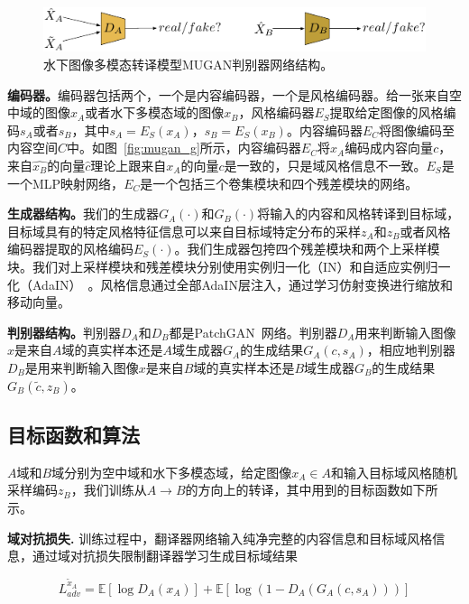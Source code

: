 \begin{figure}[ht]
    \centering
    \includegraphics[width=1\textwidth]{figures/D.pdf}
    \caption{水下图像多模态转译模型MUGAN判别器网络结构。}
    \label{fig:mugan_d}
\end{figure}

\textbf{编码器。}编码器包括两个，一个是内容编码器，一个是风格编码器。给一张来自空中域的图像$x_A$或者水下多模态域的图像$x_B$，风格编码器$E_S$提取给定图像的风格编码$s_A$或者$s_B$，其中$s_A = E_S(x_A)$，$s_B = E_S(x_B)$。内容编码器$E_C$将图像编码至内容空间$C$中。如图~\ref{fig:mugan_g}所示，内容编码器$E_C$将$x_A$编码成内容向量$c$，来自$\hat{x_B}$的向量$\hat{c}$理论上跟来自$x_A$的向量$c$是一致的，只是域风格信息不一致。$E_S$是一个MLP映射网络，$E_C$是一个包括三个卷集模块和四个残差模块的网络。

\textbf{生成器结构。}我们的生成器$G_A(\cdot)$和$G_B(\cdot)$将输入的内容和风格转译到目标域，目标域具有的特定风格特征信息可以来自目标域特定分布的采样$z_A$和$z_B$或者风格编码器提取的风格编码$E_S(\cdot)$。我们生成器包挎四个残差模块和两个上采样模块。我们对上采样模块和残差模块分别使用实例归一化（IN）和自适应实例归一化（AdaIN）~\cite{huang2017arbitrary}。风格信息通过全部AdaIN层注入，通过学习仿射变换进行缩放和移动向量。

\textbf{判别器结构。}判别器$D_A$和$D_B$都是PatchGAN~\cite{isola2017image}网络。判别器$D_A$用来判断输入图像$x$是来自$A$域的真实样本还是$A$域生成器$G_A$的生成结果$G_A(c,s_A)$，相应地判别器$D_B$是用来判断输入图像$x$是来自$B$域的真实样本还是$B$域生成器$G_B$的生成结果$G_B(\tilde{c},z_B)$。

\subsection{目标函数和算法}
$A$域和$B$域分别为空中域和水下多模态域，给定图像$x_A \in A$和输入目标域风格随机采样编码$z_B$，我们训练从$A \rightarrow B$的方向上的转译，其中用到的目标函数如下所示。

\textbf{域对抗损失.} 训练过程中，翻译器网络输入纯净完整的内容信息和目标域风格信息，通过域对抗损失限制翻译器学习生成目标域结果

\begin{equation}
\label{equ:adv_a_}
L_{adv}^{\tilde{x}_A} = \mathbb{E}[\log D_A(x_A)] + \mathbb{E}[\log(1-D_A(G_A(c,s_A)))]
\end{equation}

